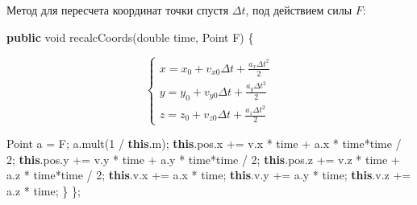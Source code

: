 \documentclass[
  12pt,
  a4paper,
]{article}
\newenvironment{Shaded}{}{}
\newcommand{\BuiltInTok}[1]{#1}
\newcommand{\DataTypeTok}[1]{\textcolor[rgb]{0.56,0.13,0.00}{#1}}
\newcommand{\DecValTok}[1]{\textcolor[rgb]{0.25,0.63,0.44}{#1}}
\newcommand{\FunctionTok}[1]{\textcolor[rgb]{0.02,0.16,0.49}{#1}}
\newcommand{\KeywordTok}[1]{\textcolor[rgb]{0.00,0.44,0.13}{\textbf{#1}}}
\newcommand{\NormalTok}[1]{#1}
\newcommand{\OperatorTok}[1]{\textcolor[rgb]{0.40,0.40,0.40}{#1}}
\begin{document}
Метод для пересчета координат точки спустя \(\Delta t\), под действием
силы \(F\):

\begin{Shaded}
\begin{Highlighting}[]
\KeywordTok{public} \DataTypeTok{void} \FunctionTok{recalcCoords}\OperatorTok{(}\DataTypeTok{double}\NormalTok{ time}\OperatorTok{,} \BuiltInTok{Point}\NormalTok{ F}\OperatorTok{)} \OperatorTok{\{}
\end{Highlighting}
\end{Shaded}

\begin{equation*}
\begin{cases}
x = x_{0} + v_{x0} \Delta t + \frac{a_{x} \Delta t ^2}{2} \\
y = y_{0} + v_{y0} \Delta t + \frac{a_{y} \Delta t ^2}{2} \\
z = z_{0} + v_{z0} \Delta t + \frac{a_{z} \Delta t ^2}{2}
\end{cases}
\end{equation*}

\begin{Shaded}
\begin{Highlighting}[]
        \BuiltInTok{Point}\NormalTok{ a }\OperatorTok{=}\NormalTok{ F}\OperatorTok{;}
\NormalTok{        a}\OperatorTok{.}\FunctionTok{mult}\OperatorTok{(}\DecValTok{1} \OperatorTok{/} \KeywordTok{this}\OperatorTok{.}\FunctionTok{m}\OperatorTok{);}
        \KeywordTok{this}\OperatorTok{.}\FunctionTok{pos}\OperatorTok{.}\FunctionTok{x} \OperatorTok{+=}\NormalTok{ v}\OperatorTok{.}\FunctionTok{x} \OperatorTok{*}\NormalTok{ time }\OperatorTok{+}\NormalTok{ a}\OperatorTok{.}\FunctionTok{x} \OperatorTok{*}\NormalTok{ time}\OperatorTok{*}\NormalTok{time }\OperatorTok{/} \DecValTok{2}\OperatorTok{;}
        \KeywordTok{this}\OperatorTok{.}\FunctionTok{pos}\OperatorTok{.}\FunctionTok{y} \OperatorTok{+=}\NormalTok{ v}\OperatorTok{.}\FunctionTok{y} \OperatorTok{*}\NormalTok{ time }\OperatorTok{+}\NormalTok{ a}\OperatorTok{.}\FunctionTok{y} \OperatorTok{*}\NormalTok{ time}\OperatorTok{*}\NormalTok{time }\OperatorTok{/} \DecValTok{2}\OperatorTok{;}
        \KeywordTok{this}\OperatorTok{.}\FunctionTok{pos}\OperatorTok{.}\FunctionTok{z} \OperatorTok{+=}\NormalTok{ v}\OperatorTok{.}\FunctionTok{z} \OperatorTok{*}\NormalTok{ time }\OperatorTok{+}\NormalTok{ a}\OperatorTok{.}\FunctionTok{z} \OperatorTok{*}\NormalTok{ time}\OperatorTok{*}\NormalTok{time }\OperatorTok{/} \DecValTok{2}\OperatorTok{;}
        \KeywordTok{this}\OperatorTok{.}\FunctionTok{v}\OperatorTok{.}\FunctionTok{x} \OperatorTok{+=}\NormalTok{ a}\OperatorTok{.}\FunctionTok{x} \OperatorTok{*}\NormalTok{ time}\OperatorTok{;}
        \KeywordTok{this}\OperatorTok{.}\FunctionTok{v}\OperatorTok{.}\FunctionTok{y} \OperatorTok{+=}\NormalTok{ a}\OperatorTok{.}\FunctionTok{y} \OperatorTok{*}\NormalTok{ time}\OperatorTok{;}
        \KeywordTok{this}\OperatorTok{.}\FunctionTok{v}\OperatorTok{.}\FunctionTok{z} \OperatorTok{+=}\NormalTok{ a}\OperatorTok{.}\FunctionTok{z} \OperatorTok{*}\NormalTok{ time}\OperatorTok{;}
    \OperatorTok{\}}
\OperatorTok{\};}
\end{Highlighting}
\end{Shaded}
\end{document}
